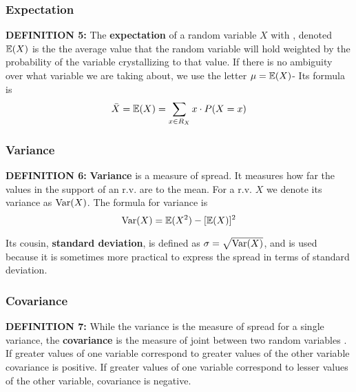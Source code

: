 \documentclass[12pt]{extarticle}
\begin{document}
            \subsubsection{Expectation}
                \textbf{DEFINITION 5:} The \textbf{expectation} of a random variable $X$ with , denoted $\operatorname{\mathbb{E}}(X)$ is the the average value that the random variable will hold weighted by the probability of the variable crystallizing to that value. If there is no ambiguity over what variable we are taking about, we use the letter $\mu = \operatorname{\mathbb{E}}(X)$- Its formula is
                    \[\bar{X} = \operatorname{\mathbb{E}}(X) = \sum_{x \in R_X} x \cdot P(X = x)\]

            
            \subsubsection{Variance}
                \textbf{DEFINITION 6:} \textbf{Variance} is a measure of spread. It measures how far the values in the support of an r.v. are to the mean. For a r.v. $X$ we denote its variance as $\textnormal{Var}(X)$. The formula for variance is
                    \[\textnormal{Var}(X) = \operatorname{\mathbb{E}}(X^2) - [\operatorname{\mathbb{E}}(X)]^2\]

                Its cousin, \textbf{standard deviation}, is defined as $\sigma = \sqrt{\textnormal{Var}(X)}$, and is used because it is sometimes more practical to express the spread in terms of standard deviation.
            
            \subsubsection{Covariance}
                \textbf{DEFINITION 7:} While the variance is the measure of spread for a single variance, the \textbf{covariance} is the measure of joint between two random variables \cite{Rice2007}. If greater values of one variable correspond to greater values of the other variable covariance is positive. If greater values of one variable correspond to lesser values of the other variable, covariance is negative.
                
\end{document}

